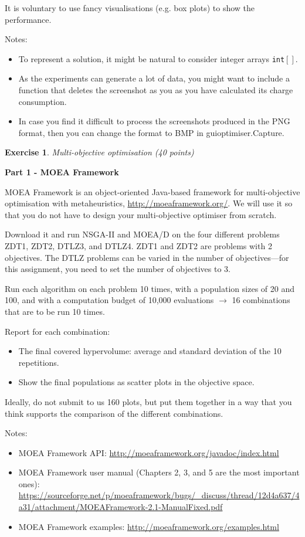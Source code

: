 \documentclass{pracs}
\newtheorem{exercise}{Exercise}
\begin{document}
It is voluntary to use fancy visualisations (e.g. box plots) to show the performance.

Notes:
\begin{itemize}
\item To represent a solution, it might be natural to consider integer arrays \texttt{int}$[]$.
\item As the experiments can generate a lot of data, you might want to include a function that deletes the screenshot as you as you have calculated its charge consumption.
\item In case you find it difficult to process the screenshots produced in the PNG format, then you can change the format to BMP in guioptimiser.Capture.
\end{itemize}




\begin{exercise}
Multi-objective optimisation (40 points)
\end{exercise}

\noindent\textbf{Part 1 - MOEA Framework}

MOEA Framework is an object-oriented Java-based framework for multi-objective optimisation with metaheuristics, \url{http://moeaframework.org/}. We will use it so that you do not have to design your multi-objective optimiser from scratch.

Download it and run NSGA-II and MOEA/D on the four different problems ZDT1, ZDT2, DTLZ3, and DTLZ4. ZDT1 and ZDT2 are problems with 2 objectives. The DTLZ problems can be varied in the number of objectives---for this assignment, you need to set the number of objectives to 3.

Run each algorithm on each problem 10 times, with a population sizes of 20 and 100, and with a computation budget of 10,000 evaluations $\rightarrow$ 16 combinations that are to be run 10 times.

Report for each combination:
\begin{itemize}
\item The final covered hypervolume: average and standard deviation of the 10 repetitions.
\item Show the final populations as scatter plots in the objective space. 
\end{itemize}

Ideally, do not submit to us 160 plots, but put them together in a way that you think supports the comparison of the different combinations.

Notes:
\begin{itemize}
\item MOEA Framework API: \url{http://moeaframework.org/javadoc/index.html}
\item MOEA Framework user manual (Chapters 2, 3, and 5 are the most important ones): \url{https://sourceforge.net/p/moeaframework/bugs/_discuss/thread/12d4a637/4a31/attachment/MOEAFramework-2.1-ManualFixed.pdf}
\item MOEA Framework examples: \url{http://moeaframework.org/examples.html}
\end{itemize}
\end{document}
